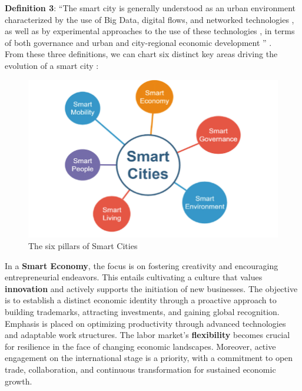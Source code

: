 \textbf{Definition 3}: ``The smart city is generally understood as an urban environment characterized by the use of Big Data, digital flows, and networked technologies \cite{kitchin2014real, townsend2013smart}, as well as by experimental approaches to the use of these technologies \cite{luque2015developing, tironi2018acknowledging}, in terms of both governance \cite{cowley2018smart, cowley2019smart} and urban and city-regional economic development \cite{caragliu2013smart}'' \cite{Caprotti2022}.
\\

From these three definitions, we can chart six distinct key areas driving the evolution of a smart city \cite{foo2}:

\begin{figure}
\centering
\includegraphics[width=0.7\columnwidth]{images/The-six-pillars-of-Smart-Cities-based-on-8.png}
\caption{The six pillars of Smart Cities \cite{foo3}}
\end{figure}


    

    
 
In a \textbf{Smart Economy}, the focus is on fostering creativity and encouraging entrepreneurial endeavors. This entails cultivating a culture that values \textbf{innovation} and actively supports the initiation of new businesses. The objective is to establish a distinct economic identity through a proactive approach to building trademarks, attracting investments, and gaining global recognition.
Emphasis is placed on optimizing productivity through advanced technologies and adaptable work structures. The labor market's \textbf{flexibility} becomes crucial for resilience in the face of changing economic landscapes. Moreover, active engagement on the international stage is a priority, with a commitment to open trade, collaboration, and continuous transformation for sustained economic growth.

